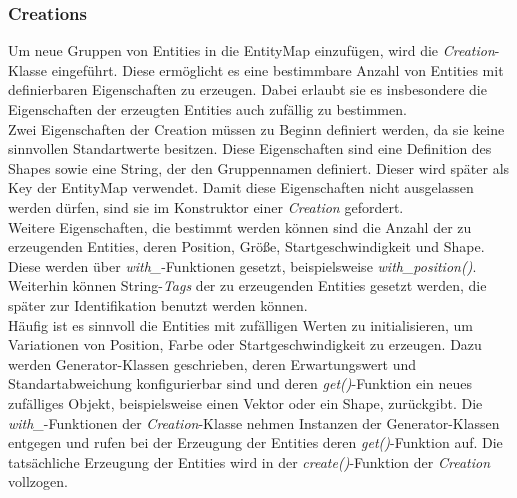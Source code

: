 \documentclass[11pt,a4paper]{article}
\begin{document}
\newpage

\subsubsection{Creations}
Um neue Gruppen von Entities in die EntityMap einzufügen, wird die \textit{Creation}-Klasse eingeführt. Diese ermöglicht es eine bestimmbare Anzahl von Entities mit definierbaren Eigenschaften zu erzeugen. Dabei erlaubt sie es insbesondere die Eigenschaften der erzeugten Entities auch zufällig zu bestimmen.\\
Zwei Eigenschaften der Creation müssen zu Beginn definiert werden, da sie keine sinnvollen Standartwerte besitzen. Diese Eigenschaften sind eine Definition des Shapes sowie eine String, der den Gruppennamen definiert. Dieser wird später als Key der EntityMap verwendet. Damit diese Eigenschaften nicht ausgelassen werden dürfen, sind sie im Konstruktor einer \textit{Creation} gefordert.\\
Weitere Eigenschaften, die bestimmt werden können sind die Anzahl der zu erzeugenden Entities, deren Position, Größe, Startgeschwindigkeit und Shape. Diese werden über \textit{with\_}-Funktionen gesetzt, beispielsweise \textit{with\_position()}. Weiterhin können String-\textit{Tags} der zu erzeugenden Entities gesetzt werden, die später zur Identifikation benutzt werden können.\\
Häufig ist es sinnvoll die Entities mit zufälligen Werten zu initialisieren, um Variationen von Position, Farbe oder Startgeschwindigkeit zu erzeugen. Dazu werden Generator-Klassen geschrieben, deren Erwartungswert und Standartabweichung konfigurierbar sind und deren \textit{get()}-Funktion ein neues zufälliges Objekt, beispielsweise einen Vektor oder ein Shape, zurückgibt. Die \textit{with\_}-Funktionen der \textit{Creation}-Klasse nehmen Instanzen der Generator-Klassen entgegen und rufen bei der Erzeugung der Entities deren \textit{get()}-Funktion auf. Die tatsächliche Erzeugung der Entities wird in der \textit{create()}-Funktion der \textit{Creation} vollzogen.

\newpage
\end{document}
